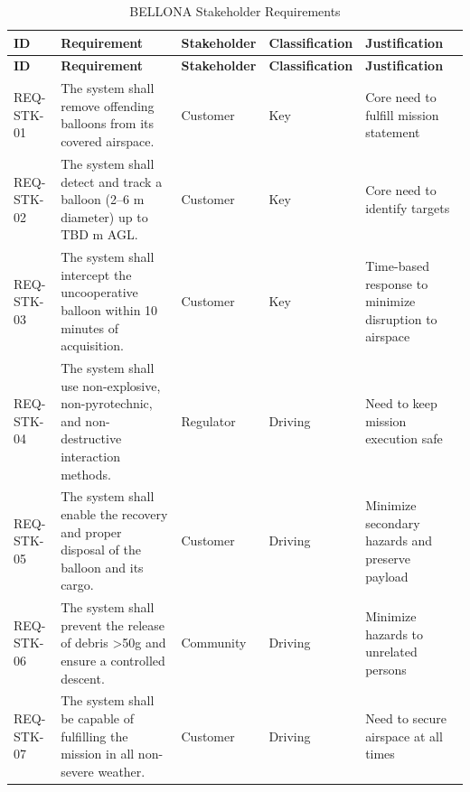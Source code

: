 \begin{xltabular}{\textwidth}{X p{0.3\textwidth} X X p{0.2\textwidth}}
\caption{BELLONA Stakeholder Requirements} \label{tab:stakeholder-requirements}\\
\hline
\textbf{ID} & \textbf{Requirement} & \textbf{Stakeholder} & \textbf{Classification} & \textbf{Justification} \\ \hline
\endfirsthead

\hline
\textbf{ID} & \textbf{Requirement} & \textbf{Stakeholder} & \textbf{Classification} & \textbf{Justification} \\ \hline
\endhead

\hline
\endfoot
%
REQ-STK-01  & The system shall remove offending balloons from its covered airspace.                            & Customer             & Key                     & Core need to fulfill mission statement                 \\
REQ-STK-02  & The system shall detect and track a balloon (2–6 m diameter) up to TBD m AGL.                    & Customer             & Key                     & Core need to identify targets                          \\
REQ-STK-03  & The system shall intercept the uncooperative balloon within 10 minutes of acquisition.           & Customer             & Key                     & Time-based response to minimize disruption to airspace \\
REQ-STK-04  & The system shall use non-explosive, non-pyrotechnic, and non-destructive interaction methods.    & Regulator            & Driving                 & Need to keep mission execution safe                    \\
REQ-STK-05  & The system shall enable the recovery and proper disposal of the balloon and its cargo.           & Customer             & Driving                 & Minimize secondary hazards and preserve payload        \\
REQ-STK-06  & The system shall prevent the release of debris \textgreater 50g and ensure a controlled descent. & Community            & Driving                 & Minimize hazards to unrelated persons                  \\
REQ-STK-07  & The system shall be capable of fulfilling the mission in all non-severe weather.                 & Customer             & Driving                 & Need to secure airspace at all times                   \\

\end{xltabular}

